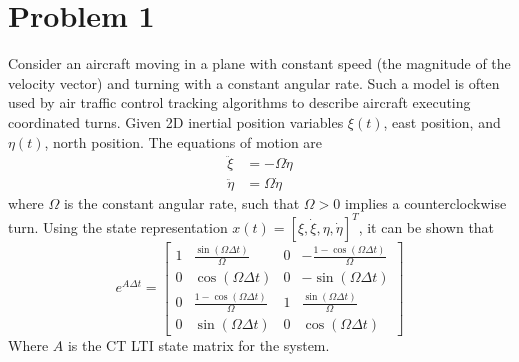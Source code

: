 \documentclass[11pt]{article}
\begin{document}
\thispagestyle{empty}

\newlength{\boxlength}\setlength{\boxlength}{\textwidth}
\addtolength{\boxlength}{-4mm}

\begin{center}
\end{center}

\section*{Problem 1}

Consider an aircraft moving in a plane with constant speed (the magnitude of the velocity vector) and turning with a constant angular rate. Such a model is often used by air traffic control tracking algorithms to describe aircraft executing coordinated turns. Given 2D inertial position variables $\xi(t)$, east position, and $\eta(t)$, north position. The equations of motion are 
\begin{align*}
	\ddot{\xi} &= -\Omega\dot{\eta} \\
	\ddot{\eta} &= \Omega\dot{\eta}
\end{align*}
where $\Omega$ is the constant angular rate, such that $\Omega > 0$ implies a counterclockwise turn. Using the state representation $x(t)=[\xi,\dot{\xi},\eta,\dot{\eta}]^T$, it can be shown that 
\begin{equation*}
	e^{A\Delta t} = \begin{bmatrix} 1 & \frac{\sin(\Omega\Delta t)}{\Omega} & 0 & -\frac{1-\cos(\Omega\Delta t)}{\Omega} \\ 0 & \cos(\Omega\Delta t) & 0 & -\sin(\Omega\Delta t) \\ 0 & \frac{1-\cos(\Omega\Delta t)}{\Omega} & 1 & \frac{\sin(\Omega\Delta t)}{\Omega} \\ 0 & \sin(\Omega\Delta t) & 0 & \cos(\Omega\Delta t) \end{bmatrix}
\end{equation*}
Where $A$ is the CT LTI state matrix for the system.
\end{document}
